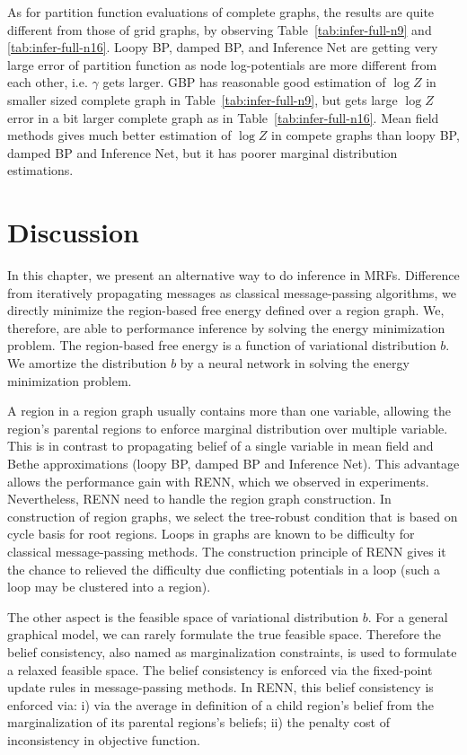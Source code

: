 As for partition function evaluations of complete graphs, the results are quite different from those of grid graphs, by observing Table~\ref{tab:infer-full-n9} and \ref{tab:infer-full-n16}. Loopy BP, damped BP, and Inference Net are getting very large error of partition function as node log-potentials are more different from each other, i.e. $\gamma$ gets larger. GBP has reasonable good estimation of $\log{Z}$ in smaller sized complete graph in Table~\ref{tab:infer-full-n9}, but gets large $\log{Z}$ error in a bit larger complete graph as in Table~\ref{tab:infer-full-n16}. Mean field methods gives much better estimation of $\log{Z}$ in compete graphs than loopy BP, damped BP and Inference Net, but it has poorer marginal distribution estimations.

\section{Discussion}
In this chapter, we present an alternative way to do inference in MRFs. Difference from iteratively propagating messages as classical message-passing algorithms, we directly minimize the region-based free energy defined over a region graph. We, therefore, are able to performance inference by solving the energy minimization problem.
The region-based free energy is a function of variational distribution $b$. We amortize the distribution $b$ by a neural network in solving the energy minimization problem.

A region in a region graph usually contains more than one variable, allowing the region's parental regions to enforce marginal distribution over multiple variable. This is in contrast to propagating belief of a single variable in mean field and Bethe approximations (loopy BP, damped BP and Inference Net). This advantage allows the performance gain with RENN, which we observed in experiments. Nevertheless, RENN need to handle the region graph construction. In construction of region graphs, we select the tree-robust condition that is based on cycle basis for root regions. Loops in graphs are known to be difficulty for classical message-passing methods. The construction principle of RENN gives it the chance to relieved the difficulty due conflicting potentials in a loop (such a loop may be clustered into a region).

The other aspect is the feasible space of variational distribution $b$. For a general graphical model, we can rarely formulate the true feasible space. Therefore the belief consistency, also named as marginalization constraints, is used to formulate a relaxed feasible space. The belief consistency is enforced via the fixed-point update rules in message-passing methods. In RENN, this belief consistency is enforced via: i) via the average in definition of a child region's belief from the marginalization of its parental regions's beliefs; ii) the penalty cost of inconsistency in objective function. 


